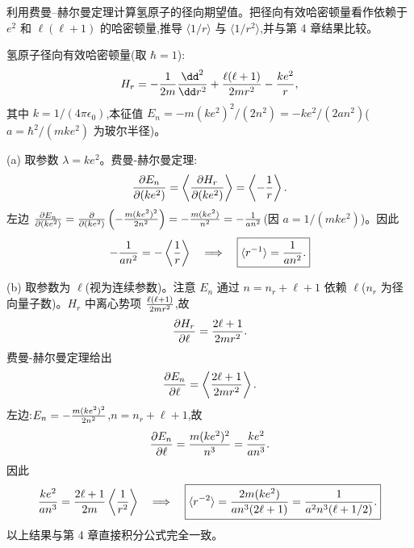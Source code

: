 \begin{question}
利用费曼--赫尔曼定理计算氢原子的径向期望值。把径向有效哈密顿量看作依赖于 $e^2$ 和 $\ell(\ell+1)$ 的哈密顿量,推导 $\langle1/r\rangle$ 与 $\langle1/r^2\rangle$,并与第 4 章结果比较。
\begin{solution}
氢原子径向有效哈密顿量(取 $\hbar=1$):
\[
H_r = -{1\over2m}{\dd^2\over\dd r^2} + {\ell(\ell+1)\over2mr^2} - {ke^2\over r},
\]
其中 $k=1/(4\pi\epsilon_0)$,本征值 $E_n=-m(ke^2)^2/(2n^2)=-ke^2/(2an^2)$($a=\hbar^2/(mke^2)$ 为玻尔半径)。

(a) 取参数 $\lambda=ke^2$。费曼-赫尔曼定理:
\[
{\partial E_n\over\partial(ke^2)} = \left\langle {\partial H_r\over\partial(ke^2)} \right\rangle = \left\langle -{1\over r} \right\rangle.
\]
左边 ${\partial E_n\over\partial(ke^2)} = {\partial\over\partial(ke^2)}\left(-{m(ke^2)^2\over2n^2}\right) = -{m(ke^2)\over n^2} = -{1\over a n^2}$(因 $a=1/(mke^2)$)。因此
\[
-{1\over a n^2} = -\left\langle {1\over r} \right\rangle\quad\Longrightarrow\quad
\boxed{\langle r^{-1}\rangle = {1\over an^2}.}
\]

(b) 取参数为 $\ell$(视为连续参数)。注意 $E_n$ 通过 $n=n_r+\ell+1$ 依赖 $\ell$($n_r$ 为径向量子数)。$H_r$ 中离心势项 ${\ell(\ell+1)\over2mr^2}$,故
\[
{\partial H_r\over\partial\ell} = {2\ell+1\over2mr^2}.
\]
费曼-赫尔曼定理给出
\[
{\partial E_n\over\partial\ell} = \left\langle {2\ell+1\over2mr^2} \right\rangle.
\]
左边:$E_n=-{m(ke^2)^2\over2n^2}$,$n=n_r+\ell+1$,故
\[
{\partial E_n\over\partial\ell} = {m(ke^2)^2\over n^3} = {ke^2\over a n^3}.
\]
因此
\[
{ke^2\over a n^3} = {2\ell+1\over2m}\left\langle{1\over r^2}\right\rangle
\quad\Longrightarrow\quad
\boxed{\langle r^{-2}\rangle = {2m(ke^2)\over a n^3(2\ell+1)} = {1\over a^2 n^3(\ell+1/2)}.}
\]
以上结果与第 4 章直接积分公式完全一致。
\end{solution}
\end{question}

